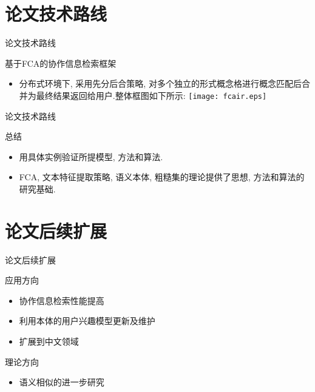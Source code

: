 \documentclass[dvipdfm]{beamer}
\begin{document}
\section{论文技术路线}
\begin{frame}[t]{论文技术路线}
  \begin{block}{基于FCA的协作信息检索框架}
    \begin{itemize}
    \item 分布式环境下, 采用先分后合策略, 对多个独立的形式概念格进行概念匹配后合并为最终结果返回给用户.\pause 整体框图如下所示: 
    \centering \texttt{[image: fcair.eps]}
    \end{itemize}
  \end{block}
\end{frame}

\begin{frame}[t]{论文技术路线}
  \begin{block}{总结}
    \begin{itemize}
    \item 用具体实例验证所提模型, 方法和算法.
    \item \alert{FCA}, \alert{文本特征提取策略}, \alert{语义本体}, \alert{粗糙集}的理论提供了思想, 方法和算法的研究基础.
    \end{itemize}
  \end{block}
\end{frame}

\section{论文后续扩展}
\begin{frame}[t]{论文后续扩展}
  \begin{block}{应用方向}
    \begin{itemize}
    \item 协作信息检索性能提高
    \item 利用本体的用户兴趣模型更新及维护
    \item 扩展到中文领域 
    \end{itemize}
  \end{block}
  \begin{block}{理论方向}
    \begin{itemize}
    \item  语义相似的进一步研究
    \end{itemize}
  \end{block}
\end{frame}
\end{document}
